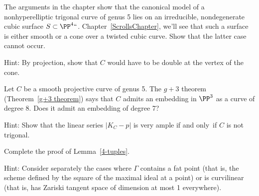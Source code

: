 \begin{exercise}\label{ex7.6}
The arguments in the chapter show that the canonical model of a
nonhyperelliptic trigonal curve of genus 5 lies on an irreducible,
nondegenerate
cubic surface $S \subset \PP^4` `$.
%
Chapter~\ref{ScrollsChapter}, we'll see that such a surface is either
smooth or a cone over a twisted cubic curve. Show that the latter case
cannot occur.

Hint: By projection, show that $C$ would have to be double at the vertex of the cone.
\end{exercise}

\begin{exercise}\label{ex7.7}
Let $C$ be a smooth projective curve of genus 5. The
$g+3$ theorem
%
(Theorem~\ref{g+3 theorem}) says that $C$ admits an embedding in
$\PP^3$ as a
curve of degree 8.
%
Does it admit an embedding of degree 7?

Hint: Show that the linear series $|K_C - p|$ is very ample if and only~if $C$ is not trigonal.
\end{exercise}

\begin{exercise}\label{nonred 4-tuples}\label{ex7.8}
Complete the proof of Lemma~\ref{4-tuples}.

Hint: Consider separately the cases where $\Gamma$ contains a
fat point
%
(that is, the scheme defined by the square of the maximal ideal at a
point) or is
curvilinear
%
(that is, has Zariski tangent space of
dimension at most 1 everywhere).
\end{exercise}


